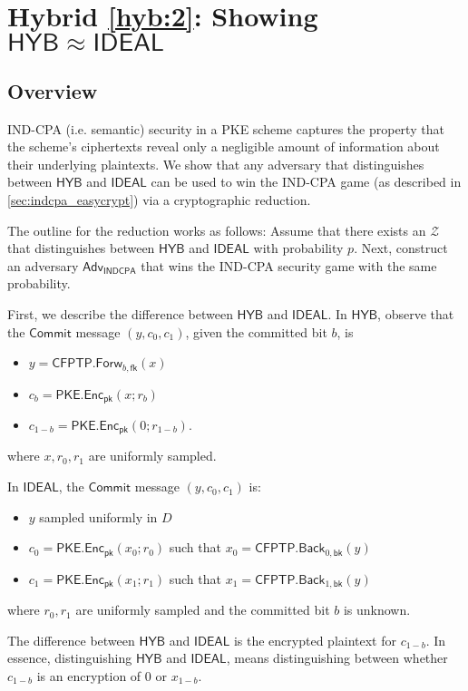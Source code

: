 \documentclass{article}[12pt]
\newcommand{\CommitMsg}{\mathsf{Commit}}
\newcommand{\PKE}{\mathsf{PKE}}
\newcommand{\Enc}{\mathsf{Enc}}
\newcommand{\Indcpa}{\mathsf{INDCPA}}
\newcommand{\EncKey}{\mathsf{pk}}
\newcommand{\CFPTP}{\mathsf{CFPTP}}
\newcommand{\Forw}{\mathsf{Forw}}
\newcommand{\Back}{\mathsf{Back}}
\newcommand{\ForwKey}{\mathsf{fk}}
\newcommand{\BackKey}{\mathsf{bk}}
\newcommand{\Domain}{D}
\newcommand{\Adversary}{{\mathsf{Adv}}} %
\newcommand{\Environment}{{\mathcal{Z}}} %
\newcommand{\IndcpaAdversary}{{\Adversary_\Indcpa}}
\newcommand{\Ideal}{{\mathsf{IDEAL}}}
\newcommand{\Hyb}{{\mathsf{HYB}}}
\begin{document}
\section{Hybrid \ref{hyb:2}: Showing $\Hyb \approx \Ideal$}\label{sec:hyb2}

\subsection{Overview}\label{sec:indcpa_overview}
IND-CPA (i.e. semantic) security in a PKE scheme captures the property that the scheme's ciphertexts reveal only a negligible amount of information about their underlying plaintexts. We show that any adversary that distinguishes between $\Hyb$ and $\Ideal$ can be used to win the IND-CPA game (as described in \cref{sec:indcpa_easycrypt}) via a cryptographic reduction.

The outline for the reduction works as follows: Assume that there exists an $\Environment$ that distinguishes between $\Hyb$ and $\Ideal$ with probability $p$. Next, construct an adversary $\IndcpaAdversary$ that wins the IND-CPA security game with the same probability.

First, we describe the difference between $\Hyb$ and $\Ideal$. In $\Hyb$, observe that the $\CommitMsg$ message $(y, c_0, c_1)$, given the committed bit $b$, is
\begin{itemize}
	\item $y = \CFPTP.\Forw_{b, \ForwKey}(x)$
	\item $c_b = \PKE.\Enc_\EncKey(x; r_b)$
	\item $c_{1-b} = \PKE.\Enc_\EncKey(0; r_{1-b})$.
\end{itemize}
where $x, r_0, r_1$ are uniformly sampled.

In $\Ideal$, the $\CommitMsg$ message $(y, c_0, c_1)$ is:
\begin{itemize}
	\item $y$ sampled uniformly in $\Domain$
	\item $c_0 = \PKE.\Enc_\EncKey(x_0; r_0)$ such that $x_0 = \CFPTP.\Back_{0, \BackKey}(y)$
	\item $c_1 = \PKE.\Enc_\EncKey(x_1; r_1)$ such that $x_1 = \CFPTP.\Back_{1, \BackKey}(y)$
\end{itemize}
where $r_0, r_1$ are uniformly sampled and the committed bit $b$ is unknown.

The difference between $\Hyb$ and $\Ideal$ is the encrypted plaintext for $c_{1-b}$. In essence, distinguishing $\Hyb$ and $\Ideal$, means distinguishing between whether $c_{1-b}$ is an encryption of $0$ or $x_{1-b}$.
\end{document}
